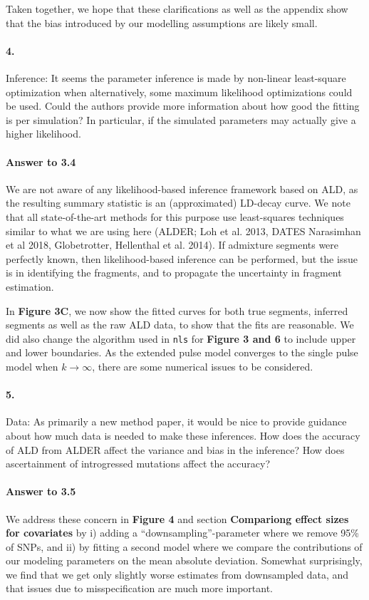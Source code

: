 \documentclass[11pt]{article}
\let\oldparagraph\paragraph
\renewcommand{\paragraph}[1]{\oldparagraph{#1}\mbox{}}
\begin{document}
Taken together, we hope that these clarifications as well as the appendix show that the bias introduced by our modelling assumptions are likely small.

\paragraph{4.}
Inference: It seems the parameter inference is made by non-linear least-square optimization when alternatively, some maximum likelihood optimizations could be used. Could the authors provide more information about how good the fitting is per simulation? In particular, if the simulated parameters may actually give a higher likelihood.

\paragraph{Answer to 3.4}
We are not aware of any likelihood-based inference framework based on ALD, as the resulting summary statistic is an (approximated) LD-decay curve. We note that all state-of-the-art methods for this purpose use least-squares techniques similar to what we are using here (ALDER; Loh et al. 2013, DATES Narasimhan et al 2018, Globetrotter, Hellenthal et al. 2014). If admixture segments were perfectly known, then likelihood-based inference can be performed, but the issue is in identifying the fragments, and to propagate the uncertainty in fragment estimation.

In \textbf{Figure 3C}, we now show the fitted curves for both true segments, inferred segments as well as the raw ALD data, to show that the fits are reasonable. We did also change the algorithm used in \texttt{nls} for \textbf{Figure 3 and 6} to include upper and lower boundaries. As the extended pulse model converges to the single pulse model when $k \to \infty$, there are some numerical issues to be considered. 

\paragraph{5.} 
Data: As primarily a new method paper, it would be nice to provide guidance about how much data is needed to make these inferences. 
How does the accuracy of ALD from ALDER affect the variance and bias in the inference? 
How does ascertainment of introgressed mutations affect the accuracy? 

\paragraph{Answer to 3.5}
We address these concern in \textbf{Figure 4} and section \textbf{Compariong effect sizes for covariates} by i) adding a ``downsampling''-parameter where we remove 95\% of SNPs, and ii) by fitting a second model where we compare the contributions of our modeling parameters on the mean absolute deviation. Somewhat surprisingly, we find that we get only slightly worse estimates from downsampled data, and that issues due to misspecification are much more important. 
\end{document}
